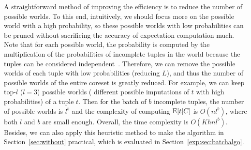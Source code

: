 A straightforward method of improving the efficiency is to reduce the number of possible worlds. To this end, intuitively, we should focus more on the possible world with a high probability, so these possible worlds with low probabilities can be pruned without sacrificing the accuracy of expectation computation much. Note that for each possible world, the probability is computed by the multiplication of the probabilities of incomplete tuples in the  world because the tuples can be considered independent~\cite{miao2022experimental}. Therefore,  we can remove the possible worlds of each tuple with low probabilities (\ie  reducing $L$), and thus the number of possible worlds of the entire coreset is greatly reduced. 
For example, we can keep top-$l$ (\eg $l=3$) possible worlds ( different possible imputations of $t$ with high probabilities) of a tuple $t$. Then for the batch of $b$ incomplete tuples, the number of possible worlds is $l^b$ and the complexity of computing $\mathrm{E}[t|C]$ is $O(nl^b)$, where both $l$ and $b$ are small enough. Overall, the time complexity is $O(Khnl^b)$. Besides, we can also apply this heuristic method to make the algorithm in Section~\ref{sec:without} practical, which is evaluated in Section~\ref{exp:sec:batchalgo}.



























